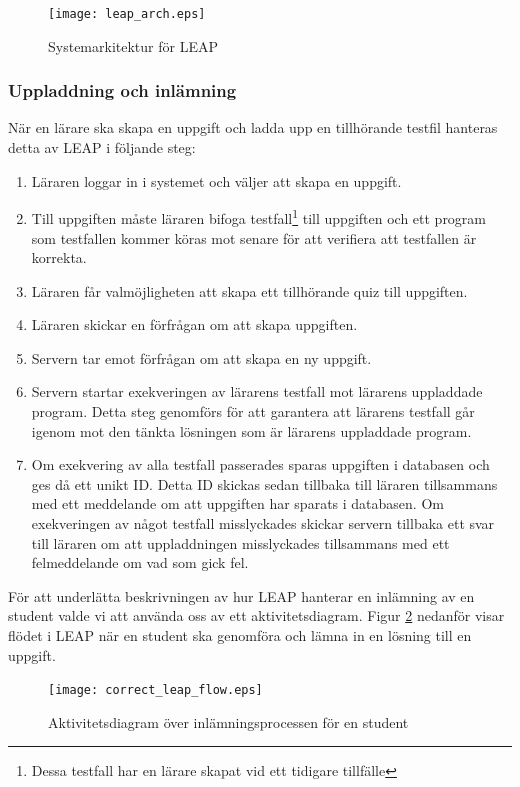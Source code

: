 \documentclass[a4paper,11pt]{article}
\begin{document}
{\begin{figure}[ht!]
\centering
\texttt{[image: leap\_arch.eps]}
\caption{Systemarkitektur för LEAP}
\label{fig:LeapArch}
\end{figure}

\newpage
\subsubsection{Uppladdning och inlämning}

När en lärare ska skapa en uppgift och ladda upp en tillhörande testfil hanteras detta av LEAP i följande steg: 
\begin{enumerate}
\item
Läraren loggar in i systemet och väljer att skapa en uppgift.
\item
Till uppgiften måste läraren bifoga testfall\footnote{Dessa testfall har en lärare skapat vid ett tidigare tillfälle} till uppgiften och ett program som testfallen kommer köras mot senare för att verifiera att testfallen är korrekta.
\item
Läraren får valmöjligheten att skapa ett tillhörande quiz till uppgiften.
\item
Läraren skickar en förfrågan om att skapa uppgiften.
\item
Servern tar emot förfrågan om att skapa en ny uppgift.
\item
Servern startar exekveringen av lärarens testfall mot lärarens uppladdade program. Detta steg genomförs för att garantera att lärarens testfall går igenom mot den tänkta lösningen som är lärarens uppladdade program.
\item
Om exekvering av alla testfall passerades sparas uppgiften i databasen och ges då ett unikt ID. Detta ID skickas sedan tillbaka till läraren tillsammans med ett meddelande om att uppgiften har sparats i databasen. Om exekveringen av något testfall misslyckades skickar servern tillbaka ett svar till läraren om att uppladdningen misslyckades tillsammans med ett felmeddelande om vad som gick fel.
\end{enumerate}

\newpage

För att underlätta beskrivningen av hur LEAP hanterar en inlämning av en student valde vi att använda oss av ett aktivitetsdiagram. Figur \ref{fig:LeapFlow} nedanför visar flödet i LEAP när en student ska genomföra och lämna in en lösning till en uppgift.

\begin{figure}[ht!]
\centering
\texttt{[image: correct\_leap\_flow.eps]}
\caption{Aktivitetsdiagram över inlämningsprocessen för en student}
\label{fig:LeapFlow}
\end{figure}

}
\end{document}
